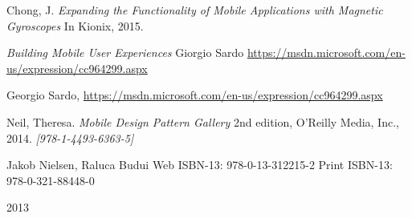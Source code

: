 \begin{thebibliography}{9}

  Chong, J. 
  \textit{Expanding the Functionality of Mobile Applications with Magnetic Gyroscopes} 
  In Kionix,
  2015.
  
	\textit{Building Mobile User Experiences}
	Giorgio Sardo
	\url{https://msdn.microsoft.com/en-us/expression/cc964299.aspx}
	
  Georgio Sardo,
  \url{https://msdn.microsoft.com/en-us/expression/cc964299.aspx}

	Neil, Theresa.
	\textit{Mobile Design Pattern Gallery}
	2nd edition,
	O'Reilly Media, Inc.,
	2014.
	\textit{[978-1-4493-6363-5]}
		
	Jakob Nielsen, Raluca Budui
	Web ISBN-13: 978-0-13-312215-2
	Print ISBN-13: 978-0-321-88448-0

\end{thebibliography}2013